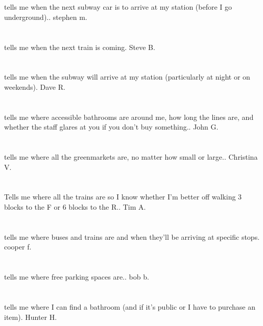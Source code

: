 \section{}tells me when the next subway car is to arrive at my station (before I go underground).. stephen m.
\section{}tells me when the next train is coming. Steve B.
\section{}tells me when the subway will arrive at my station (particularly at night or on weekends). Dave R.
\section{}tells me where accessible bathrooms are around me,  how long the lines are,  and whether the staff glares at you if you don't buy something.. John G.
\section{}tells me where all the greenmarkets are,  no matter how small or large.. Christina  V.
\section{}Tells me where all the trains are so I know whether I'm better off walking 3 blocks to the F or 6 blocks to the R.. Tim A.
\section{}tells me where buses and trains are and when they'll be arriving at specific stops. cooper f.
\section{}tells me where free parking spaces are.. bob b.
\section{}tells me where I can   find a bathroom (and if it's public or I have to purchase an item). Hunter H.
